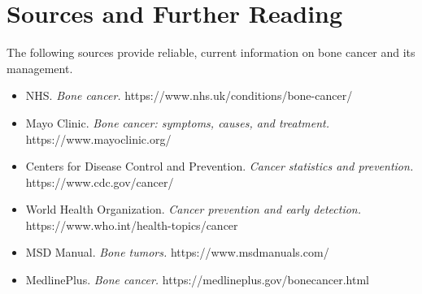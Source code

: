 \section*{Sources and Further Reading}
The following sources provide reliable, current information on bone cancer and its management.
\begin{itemize}
    \item NHS. \textit{Bone cancer.} https://www.nhs.uk/conditions/bone-cancer/
    \item Mayo Clinic. \textit{Bone cancer: symptoms, causes, and treatment.} https://www.mayoclinic.org/
    \item Centers for Disease Control and Prevention. \textit{Cancer statistics and prevention.} https://www.cdc.gov/cancer/
    \item World Health Organization. \textit{Cancer prevention and early detection.} https://www.who.int/health-topics/cancer
    \item MSD Manual. \textit{Bone tumors.} https://www.msdmanuals.com/
    \item MedlinePlus. \textit{Bone cancer.} https://medlineplus.gov/bonecancer.html
\end{itemize}

